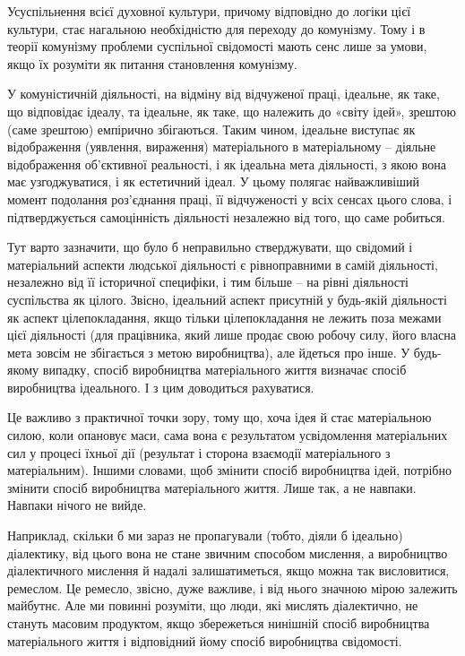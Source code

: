 \documentclass[../main]{subfiles}
\begin{document}
Усуспільнення всієї духовної культури, причому відповідно до логіки цієї культури, стає нагальною необхідністю для переходу до комунізму. Тому і в теорії комунізму проблеми суспільної свідомості мають сенс лише за умови, якщо їх розуміти як питання становлення комунізму.

У комуністичній діяльності, на відміну від відчуженої праці, ідеальне, як таке, що відповідає ідеалу, та ідеальне, як таке, що належить до «світу ідей», зрештою (саме зрештою) емпірично збігаються. Таким чином, ідеальне виступає як відображення (уявлення, вираження) матеріального в матеріальному – діяльне відображення об’єктивної реальності, і як ідеальна мета діяльності, з якою вона має узгоджуватися, і як естетичний ідеал. У цьому полягає найважливіший момент подолання роз’єднання праці, її відчуженості у всіх сенсах цього слова, і підтверджується самоцінність діяльності незалежно від того, що саме робиться.

Тут варто зазначити, що було б неправильно стверджувати, що свідомий і матеріальний аспекти людської діяльності є рівноправними в самій діяльності, незалежно від її історичної специфіки, і тим більше – на рівні діяльності суспільства як цілого. Звісно, ідеальний аспект присутній у будь-якій діяльності як аспект цілепокладання, якщо тільки цілепокладання не лежить поза межами цієї діяльності (для працівника, який лише продає свою робочу силу, його власна мета зовсім не збігається з метою виробництва), але йдеться про інше. У будь-якому випадку, спосіб виробництва матеріального життя визначає спосіб виробництва ідеального. І з цим доводиться рахуватися.

Це важливо з практичної точки зору, тому що, хоча ідея й стає матеріальною силою, коли опановує маси, сама вона є результатом усвідомлення матеріальних сил у процесі їхньої дії (результат і сторона взаємодії матеріального з матеріальним). Іншими словами, щоб змінити спосіб виробництва ідей, потрібно змінити спосіб виробництва матеріального життя. Лише так, а не навпаки. Навпаки нічого не вийде.

Наприклад, скільки б ми зараз не пропагували (тобто, діяли б ідеально) діалектику, від цього вона не стане звичним способом мислення, а виробництво діалектичного мислення й надалі залишатиметься, якщо можна так висловитися, ремеслом. Це ремесло, звісно, дуже важливе, і від нього значною мірою залежить майбутнє. Але ми повинні розуміти, що люди, які мислять діалектично, не стануть масовим продуктом, якщо збережеться нинішній спосіб виробництва матеріального життя і відповідний йому спосіб виробництва свідомості.
\end{document}
